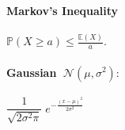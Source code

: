\documentclass[11pt]{scrartcl}
\begin{document}
\begin{multicols}{3}
\paragraph{Markov's Inequality}
$\mathbb{P}(X \geq a) \leq \frac{\mathbb{E}(X)}{a}$.

\paragraph{Gaussian $~ \mathcal{N}(\mu, \sigma^2):$}
$\dfrac{1}{\sqrt{2\sigma^2\pi} } \; e^{ -\frac{(x-\mu)^2}{2\sigma^2} }$

\end{multicols}
\end{document}
